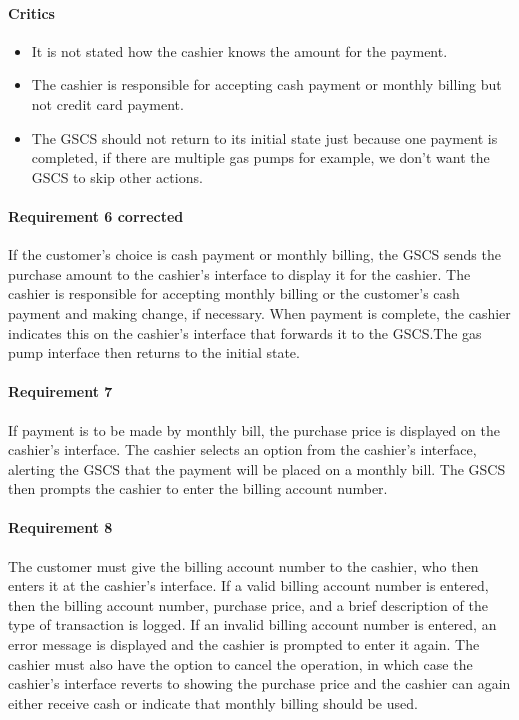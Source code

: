 \begin{framed}
    \paragraph{Critics}
    \begin{itemize}
        \item It is not stated how the cashier knows the amount for the payment.
        \item The cashier is responsible for accepting cash payment or
            monthly billing but not credit card payment.
        \item The GSCS should not return to its initial state just because one
        payment is completed, if there are multiple gas pumps for example, we
        don't want the GSCS to skip other actions.
    \end{itemize}

    \paragraph{Requirement 6 corrected} If the customer's choice is cash payment
    or monthly billing, the GSCS sends the purchase amount to the cashier's
    interface to display it for the cashier. The cashier is responsible for
    accepting monthly billing or the
    customer's cash payment and making change, if necessary. When payment is
    complete, the cashier indicates this on the cashier's interface that
    forwards it to the GSCS.\@ The gas
    pump interface then returns to the initial state.
\end{framed}

\paragraph{Requirement 7} If payment is to be made by monthly bill, the
purchase price is displayed on the cashier's interface. The cashier
selects an option from the cashier's interface, alerting the GSCS that the
payment will be placed on a monthly bill. The GSCS then prompts the cashier
to enter the billing account number.

\paragraph{Requirement 8} The customer must give the billing account number
to the cashier, who then enters it at the cashier's interface. If a valid
billing account number is entered, then the billing account number, purchase
price, and a brief description of the type of transaction is logged. If an
invalid billing account number is entered, an error message is displayed
and the cashier is prompted to enter it again. The cashier must also have
the option to cancel the operation, in which case the cashier's interface
reverts to showing the purchase price and the cashier can again either
receive cash or indicate that monthly billing should be used.

